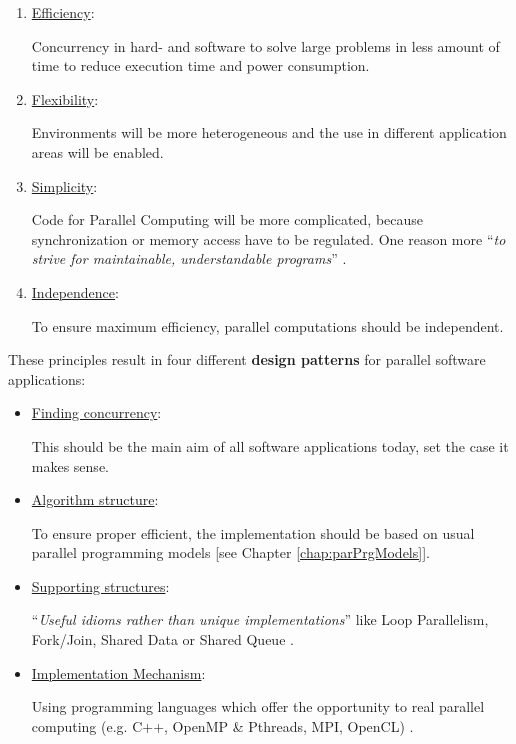 \begin{enumerate}
	\item \underline{Efficiency}: 
	
	Concurrency in hard- and software to solve large problems in less amount of time to reduce execution time and power consumption.
		
	\item \underline{Flexibility}: 
	
	Environments will be more heterogeneous and the use in different application areas will be enabled.
	
	\item \underline{Simplicity}:
	
	Code for Parallel Computing will be more complicated, because synchronization or memory access have to be regulated. One reason more ``\textit{to strive for maintainable,
	understandable programs}'' \parencite[see][p6]{article6}. 
	
	\item \underline{Independence}:
	
	To ensure maximum efficiency, parallel computations should be independent.
\end{enumerate}

\newpage

\noindent These principles result in four different \textbf{design patterns} \parencite[see][p11 ff.]{article6} for parallel software applications:
\begin{itemize}
  \item \underline{Finding concurrency}: 
  
  This should be the main aim of all software applications today, set the case it makes sense.
    \item \underline{Algorithm structure}: 
  
  To ensure proper efficient, the implementation should be based on usual parallel programming models [see Chapter \ref{chap:parPrgModels}].
  
  \item \underline{Supporting structures}: 
  
  ``\textit{Useful idioms rather than unique implementations}'' \parencite[see][p25]{article6} like Loop Parallelism, Fork/Join, Shared Data or Shared Queue \parencite{article6}.
  
  \item \underline{Implementation Mechanism}: 
  
  Using programming languages which offer the opportunity to real parallel computing (e.g. C++, OpenMP \& Pthreads, MPI, OpenCL) \parencite{article6}.
  
\end{itemize}


